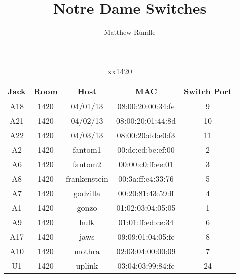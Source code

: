 \documentclass{article}
\title{Notre Dame Switches}
\author{Matthew Rundle}
\begin{document}
\maketitle

\begin{table}[H]
\caption{xx1420} \label{tab:title}
\centering
\begin{tabular}{ | c | c | c | c | c | } \hline
Jack & Room & Host & MAC & Switch Port \\ \hline
A18 & 1420 & 04/01/13 & 08:00:20:00:34:fe & 9
 \\ \hline
A21 & 1420 & 04/02/13 & 08:00:20:01:44:8d & 10
 \\ \hline
A22 & 1420 & 04/03/13 & 08:00:20:dd:e0:f3 & 11
 \\ \hline
A2 & 1420 & fantom1 & 00:de:ed:be:ef:00 & 2
 \\ \hline
A6 & 1420 & fantom2 & 00:00:c0:ff:ee:01 & 3
 \\ \hline
A8 & 1420 & frankenstein & 00:3a:ff:e4:33:76 & 5
 \\ \hline
A7 & 1420 & godzilla & 00:20:81:43:59:ff & 4
 \\ \hline
A1 & 1420 & gonzo & 01:02:03:04:05:05 & 1
 \\ \hline
A9 & 1420 & hulk & 01:01:ff:ed:ce:34 & 6
 \\ \hline
A17 & 1420 & jaws & 09:09:01:04:05:fe & 8
 \\ \hline
A10 & 1420 & mothra & 02:03:04:00:00:09 & 7
 \\ \hline
U1 & 1420 & uplink & 03:04:03:99:84:fe & 24
 \\ \hline
\end{tabular}
\end{table}
\end{document}
